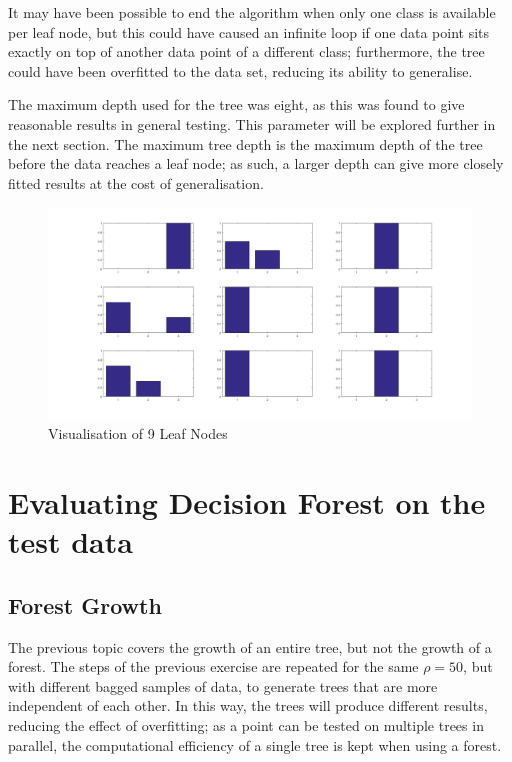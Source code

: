 \documentclass[a4paper, 10pt, conference]{ieeeconf}
\begin{document}
It may have been possible to end the algorithm when only one class is available per leaf node, but this could have caused an infinite loop if one data point sits exactly on top of another data point of a different class; furthermore, the tree could have been overfitted to the data set, reducing its ability to generalise.

The maximum depth used for the tree was eight, as this was found to give reasonable results in general testing. This parameter will be explored further in the next section. The maximum tree depth is the maximum depth of the tree before the data reaches a leaf node; as such, a larger depth can give more closely fitted results at the cost of generalisation.

\begin{figure}[!ht]
  \centering
  \includegraphics[width=\linewidth]{img/leaf_vis}
  \caption{Visualisation of 9 Leaf Nodes}
  \label{fig:leaf_vis}
\end{figure}


\section{Evaluating Decision Forest on the test data}

\subsection{Forest Growth}

The previous topic covers the growth of an entire tree, but not the growth of a forest. The steps of the previous exercise are repeated for the same $\rho=50$, but with different bagged samples of data, to generate trees that are more independent of each other. In this way, the trees will produce different results, reducing the effect of overfitting; as a point can be tested on multiple trees in parallel, the computational efficiency of a single tree is kept when using a forest.
\end{document}
